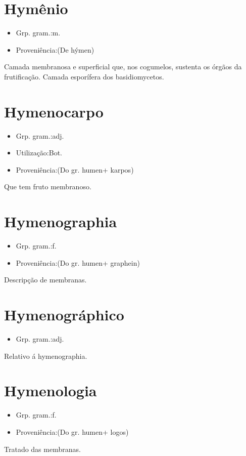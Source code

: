 \documentclass{article}
\begin{document}
\section{Hymênio}
\begin{itemize}
\item {Grp. gram.:m.}
\end{itemize}
\begin{itemize}
\item {Proveniência:(De \textunderscore hýmen\textunderscore )}
\end{itemize}
Camada membranosa e superficial que, nos cogumelos, sustenta os órgãos da frutificação.
Camada esporífera dos basidiomycetos.
\section{Hymenocarpo}
\begin{itemize}
\item {Grp. gram.:adj.}
\end{itemize}
\begin{itemize}
\item {Utilização:Bot.}
\end{itemize}
\begin{itemize}
\item {Proveniência:(Do gr. \textunderscore humen\textunderscore  + \textunderscore karpos\textunderscore )}
\end{itemize}
Que tem fruto membranoso.
\section{Hymenographia}
\begin{itemize}
\item {Grp. gram.:f.}
\end{itemize}
\begin{itemize}
\item {Proveniência:(Do gr. \textunderscore humen\textunderscore  + \textunderscore graphein\textunderscore )}
\end{itemize}
Descripção de membranas.
\section{Hymenográphico}
\begin{itemize}
\item {Grp. gram.:adj.}
\end{itemize}
Relativo á hymenographia.
\section{Hymenologia}
\begin{itemize}
\item {Grp. gram.:f.}
\end{itemize}
\begin{itemize}
\item {Proveniência:(Do gr. \textunderscore humen\textunderscore  + \textunderscore logos\textunderscore )}
\end{itemize}
Tratado das membranas.
\end{document}
